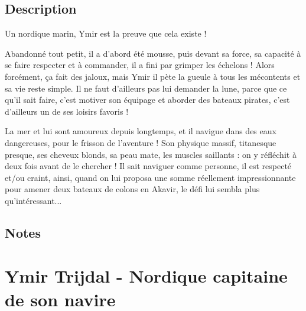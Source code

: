 \documentclass{Tamriel}
\begin{document}
\begin{multicols*}{2}
\raggedcolumns

        \section*{Description}

        Un nordique marin, Ymir est la preuve que cela existe !
        
        Abandonné tout petit, il a d'abord été mousse, puis devant sa force, sa capacité à se faire respecter et à commander, il a fini par grimper les échelons ! Alors forcément, ça fait des jaloux, mais Ymir il pète la gueule à tous les mécontents et sa vie reste simple. Il ne faut d'ailleurs pas lui demander la lune, parce que ce qu'il sait faire, c'est motiver son équipage et aborder des bateaux pirates, c'est d'ailleurs un de ses loisirs favoris !
        
        La mer et lui sont amoureux depuis longtemps, et il navigue dans des eaux dangereuses, pour le frisson de l'aventure ! Son physique massif, titanesque presque, ses cheveux blonds, sa peau mate, les muscles saillants : on y réfléchit à deux fois avant de le chercher ! Il sait naviguer comme personne, il est respecté et/ou craint, ainsi, quand on lui proposa une somme réellement impressionnante pour amener deux bateaux de colons en Akavir, le défi lui sembla plus qu'intéressant...
        
        \columnbreak

        \section*{Notes}
        
\end{multicols*}

\chapter*{Ymir Trijdal - Nordique capitaine de son navire}
\end{document}
